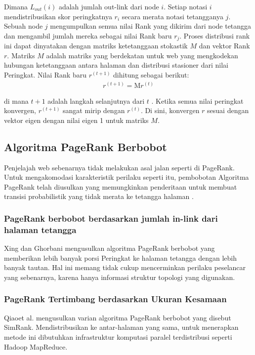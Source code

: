\documentclass[conference]{IEEEtran}
\begin{document}
Dimana \(L_{out}{(i)}\) adalah jumlah out-link dari node $i$. Setiap notasi $i$ mendistribusikan skor peringkatnya \(r_{i}\) secara merata notasi tetangganya $j$. Sebuah node $j$ mengumpulkan semua nilai Rank yang dikirim dari node tetangga dan mengambil jumlah mereka sebagai nilai Rank baru $r_{j}$. Proses distribusi rank ini dapat dinyatakan dengan matriks ketetanggaan stokastik $M$ dan vektor Rank $r$. Matriks $M$ adalah matriks yang berdekatan untuk web yang mengkodekan hubungan ketetanggaan antara halaman dan distribusi stasioner dari nilai Peringkat. Nilai Rank baru  $r^{(t+1)}$ dihitung sebagai berikut:
\begin{eqnarray}
    r^{(t+1)}=\text{M}r^{(t)}
\end{eqnarray}

di mana $t+1$ adalah langkah selanjutnya dari $t$ . Ketika semua nilai peringkat konvergen, $r^{(t+1)}$ sangat mirip dengan $r^{(t)}$. Di sini, konvergen
$r$ sesuai dengan vektor eigen dengan nilai eigen 1 untuk matriks $M$.

\subsection{Algoritma PageRank Berbobot}
Penjelajah web sebenarnya tidak melakukan asal jalan seperti di PageRank. Untuk mengakomodasi karakteristik perilaku seperti itu, pembobotan Algoritma PageRank telah diusulkan yang memungkinkan penderitaan untuk membuat transisi probabilistik yang tidak merata ke tetangga halaman \cite{xing2004weighted,qiao2010simrank,kumar2013pagerank}.

\subsubsection{PageRank berbobot berdasarkan jumlah in-link dari halaman tetangga}
Xing dan Ghorbani \cite{xing2004weighted} mengusulkan algoritma PageRank berbobot yang memberikan lebih banyak porsi Peringkat ke halaman tetangga dengan lebih banyak tautan. Hal ini memang tidak cukup mencerminkan perilaku peselancar yang sebenarnya, karena hanya informasi struktur topologi yang digunakan.

\subsubsection{PageRank Tertimbang berdasarkan Ukuran Kesamaan}
Qiaoet al. \cite{qiao2010simrank} mengusulkan varian algoritma PageRank berbobot yang disebut SimRank. Mendistribusikan ke antar-halaman yang sama, untuk menerapkan metode ini dibutuhkan infrastruktur komputasi paralel terdistribusi seperti Hadoop MapReduce.
\end{document}
